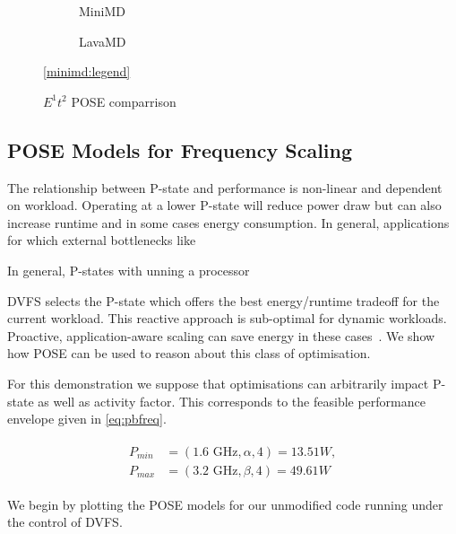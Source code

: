\begin{figure}[t]%
  \providecommand{\plotwidth}{.95\linewidth}
  \begin{subfigure}[t]{.5\linewidth}%
    \caption{MiniMD}%
    \label{fig:minimd_pose}
  \end{subfigure}%
  \begin{subfigure}[t]{.5\linewidth}%
    \caption{LavaMD}%
    \label{fig:lavamd_pose}
  \end{subfigure}%
  \begin{center}%
    \ref{minimd:legend}%
  \end{center}%
  \caption{$E^1t^2$ POSE comparrison}%
  \label{fig:comparrison}%
\end{figure}


\subsection{POSE Models for Frequency Scaling}
The relationship between P-state and performance is non-linear and dependent on workload.
Operating at a lower P-state will reduce power draw but can also increase runtime and in some cases energy consumption.
In general, applications for which external bottlenecks like 

In general, P-states with unning a processor 


DVFS selects the P-state which offers the best energy/runtime tradeoff for the current workload.
This reactive approach is sub-optimal for dynamic workloads.
Proactive, application-aware scaling can save energy in these cases~\cite{choi:2004aa}.
We show how POSE can be used to reason about this class of optimisation.

For this demonstration we suppose that optimisations can arbitrarily impact P-state as well as activity factor.
This corresponds to the feasible performance envelope given in \autoref{eq:pbfreq}.

\begin{align}
  \label{eq:pbfreq}
  \begin{split}
    P_{min} &= (1.6\text{ GHz}, \alpha, 4) = 13.51W, \\
    P_{max} &= (3.2\text{ GHz}, \beta, 4) = 49.61W
  \end{split}
\end{align}

We begin by plotting the POSE models for our unmodified code running under the control of DVFS. 

